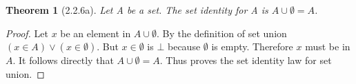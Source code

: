 \documentclass[a4paper, 12pt]{article}
\theoremstyle{plain}
\newtheorem*{theorem*}{Theorem}
\begin{document}
	
	\begin{theorem*}[2.2.6a]
		Let A be a set. The set identity for A is $A \cup \emptyset = A$.
	\end{theorem*}
	
	\begin{proof}
		Let $x$ be an element in $A \cup \emptyset$. By the definition of set union \newline $(x \in A) \lor (x \in \emptyset)$. But $x \in \emptyset$ is $\bot$ because $\emptyset$ is empty. Therefore $x$ must be in $A$. It follows directly that $A \cup \emptyset = A$. Thus proves the set identity law for set union.
	\end{proof}
\end{document}
